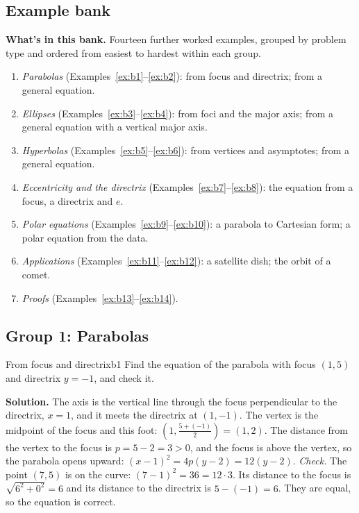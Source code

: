 \documentclass[11pt]{article}
\begin{document}
\subsection*{Example bank}

\textbf{What's in this bank.} Fourteen further worked examples, grouped by problem type and ordered from easiest to hardest within each group.
\begin{enumerate}[nosep]
  \item \emph{Parabolas} (Examples~\ref{ex:b1}--\ref{ex:b2}): from focus and directrix; from a general equation.
  \item \emph{Ellipses} (Examples~\ref{ex:b3}--\ref{ex:b4}): from foci and the major axis; from a general equation with a vertical major axis.
  \item \emph{Hyperbolas} (Examples~\ref{ex:b5}--\ref{ex:b6}): from vertices and asymptotes; from a general equation.
  \item \emph{Eccentricity and the directrix} (Examples~\ref{ex:b7}--\ref{ex:b8}): the equation from a focus, a directrix and $e$.
  \item \emph{Polar equations} (Examples~\ref{ex:b9}--\ref{ex:b10}): a parabola to Cartesian form; a polar equation from the data.
  \item \emph{Applications} (Examples~\ref{ex:b11}--\ref{ex:b12}): a satellite dish; the orbit of a comet.
  \item \emph{Proofs} (Examples~\ref{ex:b13}--\ref{ex:b14}).
\end{enumerate}

\subsection*{Group 1: Parabolas}

\begin{exmp}{From focus and directrix}{b1}
Find the equation of the parabola with focus $(1,5)$ and directrix $y=-1$, and check it.

\textbf{Solution.} The axis is the vertical line through the focus perpendicular to the directrix, $x=1$, and it meets the directrix at $(1,-1)$. The vertex is the midpoint of the focus and this foot: $\left(1,\frac{5+(-1)}2\right)=(1,2)$. The distance from the vertex to the focus is $p=5-2=3>0$, and the focus is above the vertex, so the parabola opens upward: $(x-1)^2=4p(y-2)=12(y-2)$.
\emph{Check.} The point $(7,5)$ is on the curve: $(7-1)^2=36=12\cdot3$. Its distance to the focus is $\sqrt{6^2+0^2}=6$ and its distance to the directrix is $5-(-1)=6$. They are equal, so the equation is correct.
\end{exmp}
\end{document}

